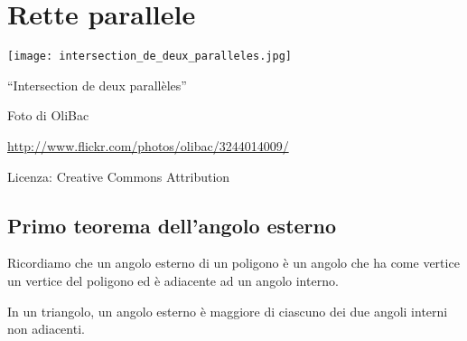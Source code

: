 
\chapter{Rette parallele}\label{chap:rette_parallele}

\texttt{[image: intersection\_de\_deux\_paralleles.jpg]}
  \begin{center}
    {\large ``Intersection de deux parallèles''}\par
    Foto di OliBac\par
    \url{http://www.flickr.com/photos/olibac/3244014009/}\par
    Licenza: Creative Commons Attribution\par
  \end{center}
\newpage

\section{Primo teorema dell'angolo esterno}\label{sect:primo_teorema_angolo_esterno}

Ricordiamo che un angolo esterno di un poligono è un angolo che ha come vertice un vertice del poligono ed è adiacente ad un angolo interno.

\begin{teorema}
In un triangolo, un angolo esterno è maggiore di ciascuno dei due angoli interni non adiacenti.
\end{teorema}

\begin{figure}[htb]
\centering
\end{figure}

